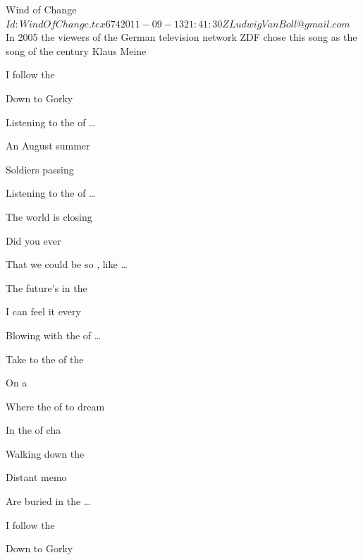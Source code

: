 \begin{SBSong}{Wind of Change}
  {$Id: WindOfChange.tex 674 2011-09-13 21:41:30Z LudwigVanBoll@gmail.com $}
  {In 2005 the viewers of the German television network ZDF chose this song as the song of the century}
  {Klaus Meine}
  \begin{SBVerse}
     I follow the 

    Down to Gorky 

    Listening to the  of \ldots{} 

     An August summer 

    Soldiers passing 

    Listening to the  of \ldots{} 
  \end{SBVerse}
  \begin{SBVerse}
     The world is closing 

    Did you ever 

    That we could be so , like \ldots{} 

     The future's in the 

    I can feel it every

    Blowing with the  of \ldots{} 
  \end{SBVerse}
  \begin{SBChorus}
     Take  to the  of the 

    On a  

    Where the  of to dream 

    In the  of cha
  \end{SBChorus}
  \begin{SBVerse}
     Walking down the 

    Distant memo

    Are buried in the  \ldots{}

     I follow the 

    Down to Gorky 


\end{SBVerse}
\end{SBSong}
